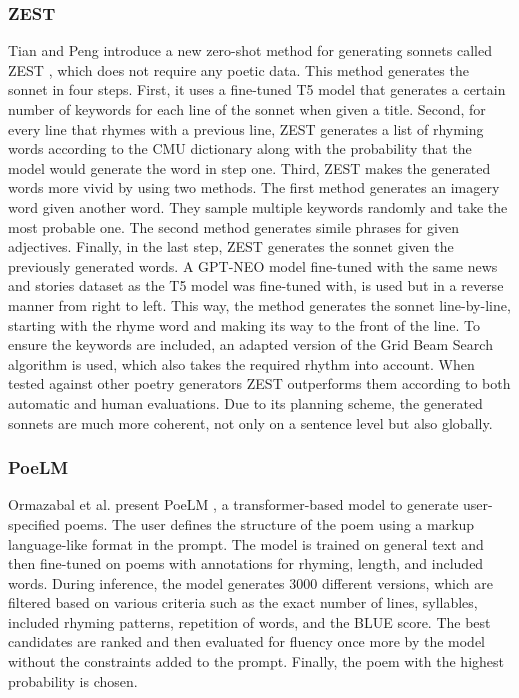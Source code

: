 \subsubsection{ZEST}
Tian and Peng introduce a new zero-shot method for generating sonnets called ZEST \cite{tian-peng-2022-zero}, which does not require any poetic data. This method generates the sonnet in four steps. First, it uses a fine-tuned T5 model that generates a certain number of keywords for each line of the sonnet when given a title. Second, for every line that rhymes with a previous line, ZEST generates a list of rhyming words according to the CMU dictionary along with the probability that the model would generate the word in step one. Third, ZEST makes the generated words more vivid by using two methods. The first method generates an imagery word given another word. They sample multiple keywords randomly and take the most probable one. The second method generates simile phrases for given adjectives. Finally, in the last step, ZEST generates the sonnet given the previously generated words. A GPT-NEO model fine-tuned with the same news and stories dataset as the T5 model was fine-tuned with, is used but in a reverse manner from right to left. This way, the method generates the sonnet line-by-line, starting with the rhyme word and making its way to the front of the line. To ensure the keywords are included, an adapted version of the Grid Beam Search algorithm\cite{hokamp_lexically_2017} is used, which also takes the required rhythm into account. When tested against other poetry generators ZEST outperforms them according to both automatic and human evaluations. Due to its planning scheme, the generated sonnets are much more coherent, not only on a sentence level but also globally.

\subsubsection{PoeLM}
Ormazabal et al. present PoeLM \cite{ormazabal-etal-2022-poelm}, a transformer-based model to generate user-specified poems. The user defines the structure of the poem using a markup language-like format in the prompt. The model is trained on general text and then fine-tuned on poems with annotations for rhyming, length, and included words. During inference, the model generates 3000 different versions, which are filtered based on various criteria such as the exact number of lines, syllables, included rhyming patterns, repetition of words, and the BLUE score. The best candidates are ranked and then evaluated for fluency once more by the model without the constraints added to the prompt. Finally, the poem with the highest probability is chosen.

